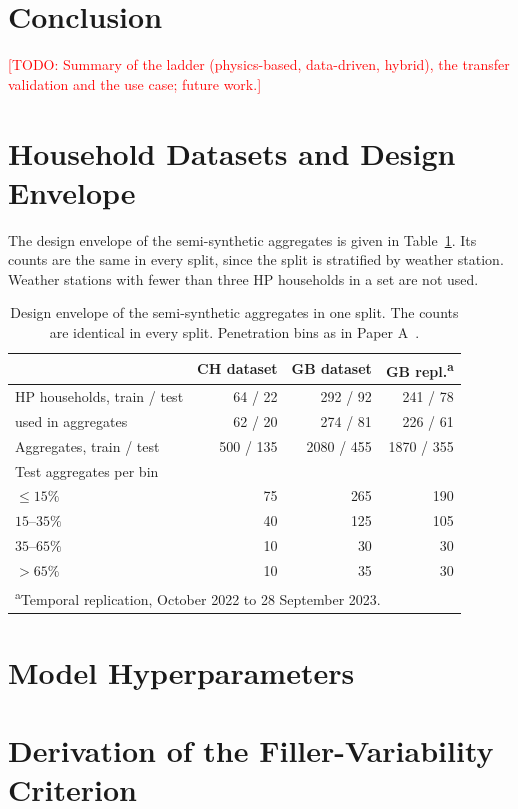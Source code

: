 \documentclass[9pt,journal,a4paper]{IEEEtran}
\newcommand{\todo}[1]{\textcolor{red}{[TODO: #1]}}
\newcommand{\dataCH}{CH dataset}
\newcommand{\dataGB}{GB dataset}
\begin{document}
\section{Conclusion}
\label{sec:conclusion}
\todo{Summary of the ladder (physics-based, data-driven, hybrid), the transfer validation and the use case; future work.}

\appendices
\section{Household Datasets and Design Envelope}
\label{app:envelope}
The design envelope of the semi-synthetic aggregates is given in Table~\ref{tab:envelope}. Its counts are the same in every split, since the split is stratified by weather station. Weather stations with fewer than three HP households in a set are not used.

\begin{table}[t]
  \centering
  \caption{Design envelope of the semi-synthetic aggregates in one split. The counts are identical in every split. Penetration bins as in Paper A~\cite{paperA}.}
  \label{tab:envelope}
  \footnotesize
  \begin{tabular}{lrrr}
    \toprule
    & \dataCH & \dataGB & GB repl.\textsuperscript{a} \\
    \midrule
    HP households, train / test & 64 / 22 & 292 / 92 & 241 / 78 \\
    \quad used in aggregates & 62 / 20 & 274 / 81 & 226 / 61 \\
    Aggregates, train / test & 500 / 135 & \num{2080} / 455 & \num{1870} / 355 \\
    Test aggregates per bin & & & \\
    \quad $\le 15\%$ & 75 & 265 & 190 \\
    \quad $15$--$35\%$ & 40 & 125 & 105 \\
    \quad $35$--$65\%$ & 10 & 30 & 30 \\
    \quad $> 65\%$ & 10 & 35 & 30 \\
    \bottomrule
    \multicolumn{4}{l}{\textsuperscript{a}Temporal replication, October 2022 to 28 September 2023.}\\
  \end{tabular}
\end{table}

\section{Model Hyperparameters}

\section{Derivation of the Filler-Variability Criterion}
\label{app:fillercrit}



\end{document}
